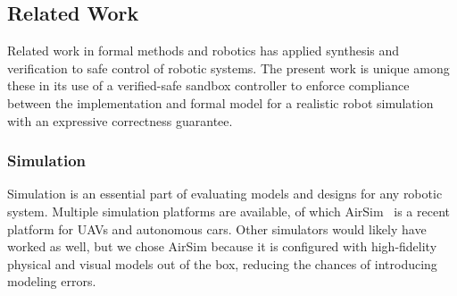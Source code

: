 \documentclass[12pt]{cmuthesis}
\theoremstyle{definition}
\theoremstyle{remark}
\newcommand{\rref}[2][]{\prettyref{#2}}
\newcommand{\VeriPhy}{VeriPhy\xspace}
\begin{document}


\subsection{Related Work}
Related work in formal methods and robotics has applied synthesis and verification to safe control of robotic systems.
The present work is unique among these in its use of a verified-safe sandbox controller to enforce compliance between the implementation and formal model for a realistic robot simulation with an expressive correctness guarantee.

\subsubsection{Simulation}
Simulation is an essential part of evaluating models and designs for any robotic system.
Multiple simulation platforms are available, of which AirSim~\cite{shah2018airsim} is a recent platform for UAVs and autonomous cars.
Other simulators would likely have worked as well, but we chose AirSim because it is configured with high-fidelity physical and visual models out of the box, reducing the chances of introducing modeling errors.
\end{document}
